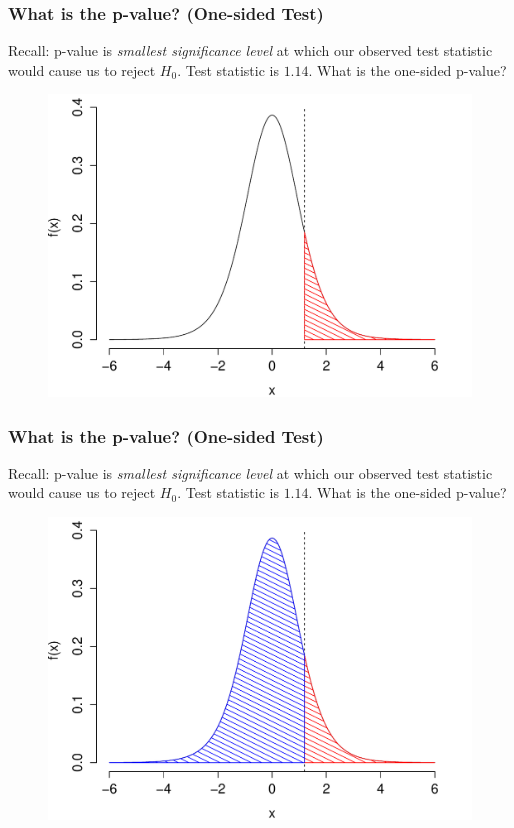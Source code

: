 \documentclass[handout]{beamer}
\begin{document}
\begin{frame}
\frametitle{What is the p-value? (One-sided Test)}
\footnotesize
Recall: p-value is \emph{smallest significance level} at which our observed test statistic would cause us to reject $H_0$. \alert{Test statistic is $1.14$. What is the one-sided p-value? }
\begin{figure}
\includegraphics[scale= 0.4]{./images/p_upper3}

\end{figure}

\end{frame}

\begin{frame}
\frametitle{What is the p-value? (One-sided Test)}
\footnotesize
Recall: p-value is \emph{smallest significance level} at which our observed test statistic would cause us to reject $H_0$. \alert{Test statistic is $1.14$. What is the one-sided p-value? }
\begin{figure}
\includegraphics[scale= 0.4]{./images/p_upper4}

\end{figure}

\end{frame}
\end{document}
